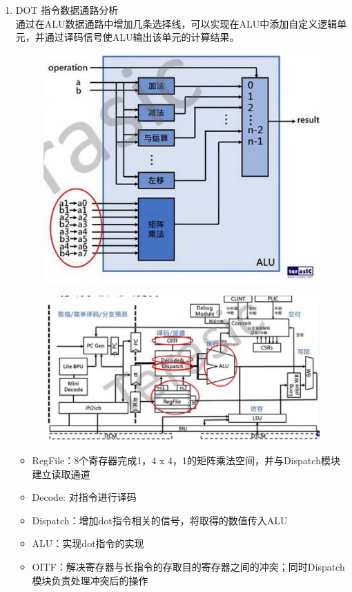 \documentclass[a4paper, 14pt, oneside]{book} %
\numberwithin{equation}{subsection}
\begin{document}
\begin{enumerate}
			\item DOT 指令数据通路分析 \\
			通过在ALU数据通路中增加几条选择线，可以实现在ALU中添加自定义逻辑单元，并通过译码信号使ALU输出该单元的计算结果。
			\begin{figure}[!htbp]
				\centering
				\includegraphics[scale=1]{img/alu2.png}
			\end{figure}
			\begin{figure}[!htbp]
				\centering
				\includegraphics[scale=0.8]{img/datalink.jpg}
			\end{figure}
			\begin{itemize}
				\item RegFile：8个寄存器完成1，4 x 4，1的矩阵乘法空间，并与Dispatch模块建立读取通道
				\item Decode: 对指令进行译码
				\item Dispatch：增加dot指令相关的信号，将取得的数值传入ALU
				\item ALU：实现dot指令的实现
				\item OITF：解决寄存器与长指令的存取目的寄存器之间的冲突；同时Dispatch模块负责处理冲突后的操作
			\end{itemize}
		\end{enumerate}
		
\end{document}
